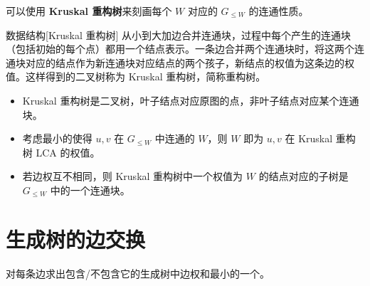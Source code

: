 可以使用\textbf{ Kruskal 重构树}来刻画每个 $W$ 对应的 $G_{\le W}$ 的连通性质。
\begin{descbox}{数据结构}[Kruskal 重构树]
    从小到大加边合并连通块，过程中每个产生的连通块（包括初始的每个点）都用一个结点表示。一条边合并两个连通块时，将这两个连通块对应的结点作为新连通块对应结点的两个孩子，新结点的权值为这条边的权值。这样得到的二叉树称为 Kruskal 重构树，简称重构树。
\end{descbox}
\begin{property}
    \begin{itemize}
        \item Kruskal 重构树是二叉树，叶子结点对应原图的点，非叶子结点对应某个连通块。
        \item 考虑最小的使得 $u,v$ 在 $G_{\le W}$ 中连通的 $W$，则 $W$ 即为 $u,v$ 在 Kruskal 重构树 LCA 的权值。
        \item 若边权互不相同，则 Kruskal 重构树中一个权值为 $W$ 的结点对应的子树是 $G_{\le W}$ 中的一个连通块。 
    \end{itemize}
\end{property}

\begin{example}[{P4768 [NOI2018] 归程}]
    
\end{example}
\begin{exercise}
    
\end{exercise}

\section{生成树的边交换}

\begin{example}
    对每条边求出包含/不包含它的生成树中边权和最小的一个。
\end{example}


